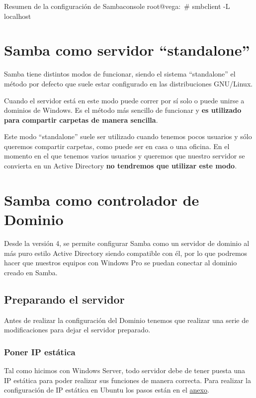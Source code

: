 \documentclass{../../../yukibook.cls/yukibook}
\begin{document}
\begin{mycode}{Resumen de la configuración de Samba}{console}{}
root@vega:~# smbclient -L localhost
\end{mycode}


\section{Samba como servidor “standalone”}
Samba tiene distintos modos de funcionar, siendo el sistema “standalone” el método por defecto que suele estar configurado en las distribuciones GNU/Linux.

Cuando el servidor está en este modo puede correr por sí solo o puede unirse a dominios de Windows. Es el método más sencillo de funcionar y \textbf{es utilizado para compartir carpetas de manera sencilla}.

Este modo “standalone” suele ser utilizado cuando tenemos pocos usuarios y sólo queremos compartir carpetas, como puede ser en casa o una oficina. En el momento en el que tenemos varios usuarios y queremos que nuestro servidor se convierta en un Active Directory \textbf{no tendremos que utilizar este modo}.


\section{Samba como controlador de Dominio}
Desde la versión 4, se permite configurar Samba como un servidor de dominio al más puro estilo Active Directory siendo compatible con él, por lo que podremos hacer que nuestros equipos con Windows Pro se puedan conectar al dominio creado en Samba.

\subsection{Preparando el servidor}
Antes de realizar la configuración del Dominio tenemos que realizar una serie de modificaciones para dejar el servidor preparado.

\subsubsection{Poner IP estática}
Tal como hicimos con Windows Server, todo servidor debe de tener puesta una IP estática para poder realizar sus funciones de manera correcta. Para realizar la configuración de IP estática en Ubuntu los pasos están en el \hyperlink{configurar_ip_estatica_ubuntu}{anexo}.
\end{document}
